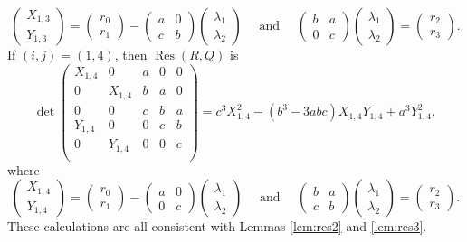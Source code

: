 \documentclass[reqno, 12pt, twoside]{amsart}
\numberwithin{equation}{section}
\DeclareMathOperator{\Res}{Res}
\newcommand{\0}{\mathbf{0}}
\theoremstyle{definition}
\begin{document}
\[\begin{pmatrix}
X_{1,3}\\
Y_{1,3}\end{pmatrix}
=\begin{pmatrix}
r_0\\
r_1\end{pmatrix}
-\begin{pmatrix}
a & 0   \\
c & b
\end{pmatrix}\begin{pmatrix}
\lambda_1    \\
\lambda_2  \end{pmatrix}\quad\text{ and }\quad\begin{pmatrix}
b & a     \\
0 & c 
\end{pmatrix}\begin{pmatrix}
\lambda_1    \\
\lambda_2  
\end{pmatrix}=\begin{pmatrix}
r_2    \\
r_3 
\end{pmatrix}.\]
If $(i,j)=(1,4)$, then $\Res(R,Q)$ is
\[\det\begin{pmatrix}
X_{1,4} & 0 & a& 0&  0    \\
0 & X_{1,4}& b& a& 0    \\
0 & 0& c& b& a   \\
Y_{1,4} & 0& 0& c& b  \\
0 & Y_{1,4}& 0& 0&  c    \\
\end{pmatrix}=c^3 X_{1,4}^2 - (b^3 - 3 a b c) X_{1,4} Y_{1,4} + a^3 Y_{1,4}^2,\]
where 
\[\begin{pmatrix}
X_{1,4}\\
Y_{1,4}\end{pmatrix}
=\begin{pmatrix}
r_0\\
r_1\end{pmatrix}
-\begin{pmatrix}
a & 0    \\
0 & c
\end{pmatrix}\begin{pmatrix}
\lambda_1    \\
\lambda_2   
\end{pmatrix}\quad\text{ and }\quad\begin{pmatrix}
b & a     \\
c & b
\end{pmatrix}\begin{pmatrix}
\lambda_1    \\
\lambda_2   
\end{pmatrix}=\begin{pmatrix}
r_2    \\
r_3  
\end{pmatrix}.\]
These calculations are all consistent with  Lemmas \ref{lem:res2} and \ref{lem:res3}.
\end{document}
